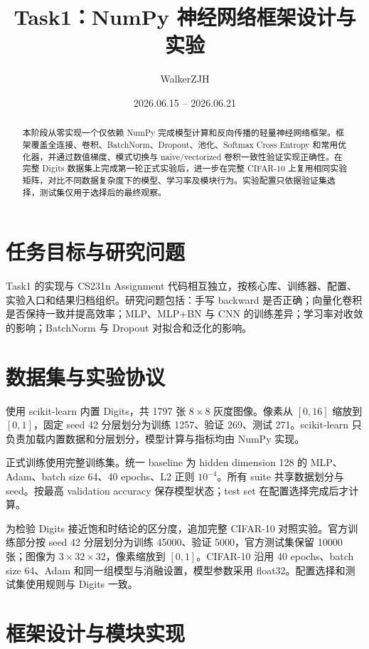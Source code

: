 \documentclass[UTF8,a4paper,11pt]{ctexart}
\title{Task1：NumPy 神经网络框架设计与实验}
\author{WalkerZJH}
\date{2026.06.15 -- 2026.06.21}
\begin{document}
\maketitle

\begin{abstract}
本阶段从零实现一个仅依赖 NumPy 完成模型计算和反向传播的轻量神经网络框架。框架覆盖全连接、卷积、BatchNorm、Dropout、池化、Softmax Cross Entropy 和常用优化器，并通过数值梯度、模式切换与 naive/vectorized 卷积一致性验证实现正确性。在完整 Digits 数据集上完成第一轮正式实验后，进一步在完整 CIFAR-10 上复用相同实验矩阵，对比不同数据复杂度下的模型、学习率及模块行为。实验配置只依据验证集选择，测试集仅用于选择后的最终观察。
\end{abstract}

\section{任务目标与研究问题}

Task1 的实现与 CS231n Assignment 代码相互独立，按核心库、训练器、配置、实验入口和结果归档组织。研究问题包括：手写 backward 是否正确；向量化卷积是否保持一致并提高效率；MLP、MLP+BN 与 CNN 的训练差异；学习率对收敛的影响；BatchNorm 与 Dropout 对拟合和泛化的影响。

\section{数据集与实验协议}

使用 scikit-learn 内置 Digits，共 1797 张 $8\times8$ 灰度图像。像素从 $[0,16]$ 缩放到 $[0,1]$，固定 seed 42 分层划分为训练 1257、验证 269、测试 271。scikit-learn 只负责加载内置数据和分层划分，模型计算与指标均由 NumPy 实现。

正式训练使用完整训练集。统一 baseline 为 hidden dimension 128 的 MLP、Adam、batch size 64、40 epochs、L2 正则 $10^{-4}$。所有 suite 共享数据划分与 seed。按最高 validation accuracy 保存模型状态；test set 在配置选择完成后才计算。

为检验 Digits 接近饱和时结论的区分度，追加完整 CIFAR-10 对照实验。官方训练部分按 seed 42 分层划分为训练 45000、验证 5000，官方测试集保留 10000 张；图像为 $3\times32\times32$，像素缩放到 $[0,1]$。CIFAR-10 沿用 40 epochs、batch size 64、Adam 和同一组模型与消融设置，模型参数采用 float32。配置选择和测试集使用规则与 Digits 一致。

\section{框架设计与模块实现}
\end{document}
